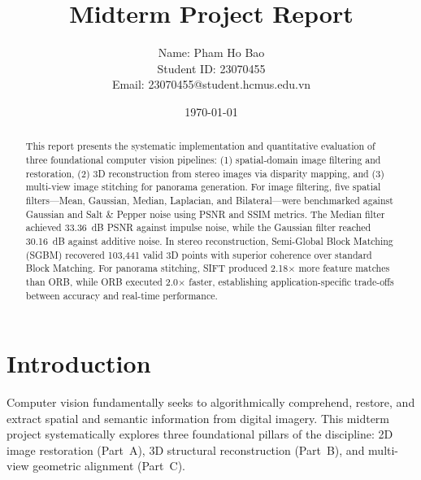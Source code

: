 \documentclass[a4paper,12pt]{article}
\begin{document}
\title{\textcolor{titleblue}{Midterm Project Report}}

\author{\parbox{0.6\linewidth}{\centering
Name: Pham Ho Bao\\
Student ID: 23070455\\
Email: 23070455@student.hcmus.edu.vn}}

\date{\today}

\maketitle

\begin{abstract}
This report presents the systematic implementation and quantitative evaluation of three foundational computer vision pipelines: (1) spatial-domain image filtering and restoration, (2) 3D reconstruction from stereo images via disparity mapping, and (3) multi-view image stitching for panorama generation. For image filtering, five spatial filters---Mean, Gaussian, Median, Laplacian, and Bilateral---were benchmarked against Gaussian and Salt \& Pepper noise using PSNR and SSIM metrics. The Median filter achieved 33.36~dB PSNR against impulse noise, while the Gaussian filter reached 30.16~dB against additive noise. In stereo reconstruction, Semi-Global Block Matching (SGBM) recovered 103,441 valid 3D points with superior coherence over standard Block Matching. For panorama stitching, SIFT produced 2.18$\times$ more feature matches than ORB, while ORB executed 2.0$\times$ faster, establishing application-specific trade-offs between accuracy and real-time performance.
\end{abstract}

\section{Introduction}

Computer vision fundamentally seeks to algorithmically comprehend, restore, and extract spatial and semantic information from digital imagery. This midterm project systematically explores three foundational pillars of the discipline: 2D image restoration (Part~A), 3D structural reconstruction (Part~B), and multi-view geometric alignment (Part~C).
\end{document}
